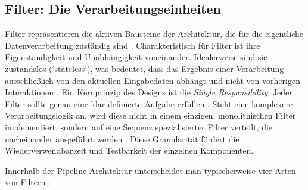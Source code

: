 \documentclass[11pt, a4paper]{article}
\begin{document}
\subsection{Filter: Die Verarbeitungseinheiten}

Filter repräsentieren die aktiven Bausteine der Architektur, die für die eigentliche Datenverarbeitung zuständig sind \cite{RichardsFord2020}. Charakteristisch für Filter ist ihre Eigenständigkeit und Unabhängigkeit voneinander. Idealerweise sind sie zustandslos (`stateless`), was bedeutet, dass das Ergebnis einer Verarbeitung ausschließlich von den aktuellen Eingabedaten abhängt und nicht von vorherigen Interaktionen \cite{RichardsFord2020}. Ein Kernprinzip des Designs ist die \textit{Single Responsibility}: Jeder Filter sollte genau eine klar definierte Aufgabe erfüllen \cite{RichardsFord2020}. Steht eine komplexere Verarbeitungslogik an, wird diese nicht in einem einzigen, monolithischen Filter implementiert, sondern auf eine Sequenz spezialisierter Filter verteilt, die nacheinander ausgeführt werden \cite{RichardsFord2020}. Diese Granularität fördert die Wiederverwendbarkeit und Testbarkeit der einzelnen Komponenten.

Innerhalb der Pipeline-Architektur unterscheidet man typischerweise vier Arten von Filtern \cite{RichardsFord2020}:
\end{document}
